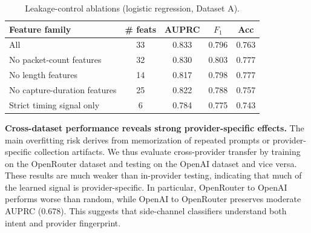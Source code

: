\begin{table}[t]
\centering
\caption{Leakage-control ablations (logistic regression, Dataset A).}
\label{tab:ablations}
\begin{tabular}{lcccc}
\hline
Feature family & \# feats & AUPRC & $F_1$ & Acc \\
\hline
All & 33 & 0.833 & 0.796 & 0.763 \\
No packet-count features & 32 & 0.830 & 0.803 & 0.777 \\
No length features & 14 & 0.817 & 0.798 & 0.777 \\
No capture-duration features & 25 & 0.822 & 0.788 & 0.757 \\
Strict timing signal only & 6 & 0.784 & 0.775 & 0.743 \\
\hline
\end{tabular}
\end{table}

\textbf{Cross-dataset performance reveals strong provider-specific effects.}
The main overfitting risk derives from memorization of repeated prompts or provider-specific collection artifacts. We thus evaluate cross-provider transfer by training on the OpenRouter dataset and testing on the OpenAI dataset and vice versa. These results are much weaker than in-provider testing, indicating that much of the learned signal is provider-specific. In particular, OpenRouter to OpenAI performs worse than random, while OpenAI to OpenRouter preserves moderate AUPRC (0.678). This suggests that side-channel classifiers understand both intent and provider fingerprint.
